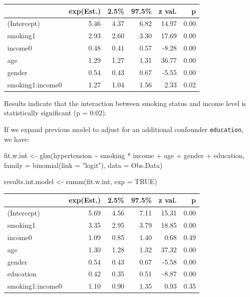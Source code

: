 \documentclass[
  letterpaper,
  DIV=11,
  numbers=noendperiod]{scrreprt}
\newenvironment{Shaded}{\begin{snugshade}}{\end{snugshade}}
\newcommand{\AttributeTok}[1]{\textcolor[rgb]{0.40,0.45,0.13}{#1}}
\newcommand{\ConstantTok}[1]{\textcolor[rgb]{0.56,0.35,0.01}{#1}}
\newcommand{\FunctionTok}[1]{\textcolor[rgb]{0.28,0.35,0.67}{#1}}
\newcommand{\NormalTok}[1]{\textcolor[rgb]{0.00,0.23,0.31}{#1}}
\newcommand{\OtherTok}[1]{\textcolor[rgb]{0.00,0.23,0.31}{#1}}
\newcommand{\SpecialCharTok}[1]{\textcolor[rgb]{0.37,0.37,0.37}{#1}}
\newcommand{\StringTok}[1]{\textcolor[rgb]{0.13,0.47,0.30}{#1}}
\begin{document}
\begin{table}[!h]
\centering
\begin{tabular}{lrrrrr}
\toprule
  & exp(Est.) & 2.5\% & 97.5\% & z val. & p\\
\midrule
(Intercept) & 5.46 & 4.37 & 6.82 & 14.97 & 0.00\\
smoking1 & 2.93 & 2.60 & 3.30 & 17.69 & 0.00\\
income0 & 0.48 & 0.41 & 0.57 & -8.28 & 0.00\\
age & 1.29 & 1.27 & 1.31 & 36.77 & 0.00\\
gender & 0.54 & 0.43 & 0.67 & -5.55 & 0.00\\
\addlinespace
smoking1:income0 & 1.27 & 1.04 & 1.56 & 2.33 & 0.02\\
\bottomrule
\end{tabular}
\end{table}

Results indicate that the interaction between smoking status and income
level is statistically significant (p = 0.02).

If we expand previous model to adjust for an additional confounder
\texttt{education}, we have:

\begin{Shaded}
\begin{Highlighting}[]
\NormalTok{fit.w.int }\OtherTok{\textless{}{-}} \FunctionTok{glm}\NormalTok{(hypertension }\SpecialCharTok{\textasciitilde{}}\NormalTok{ smoking }\SpecialCharTok{*}\NormalTok{ income }\SpecialCharTok{+}\NormalTok{ age }\SpecialCharTok{+}\NormalTok{ gender }\SpecialCharTok{+}\NormalTok{ education, }
                 \AttributeTok{family =} \FunctionTok{binomial}\NormalTok{(}\AttributeTok{link =} \StringTok{"logit"}\NormalTok{), }
                 \AttributeTok{data =}\NormalTok{ Obs.Data)}

\NormalTok{results.int.model }\OtherTok{\textless{}{-}} \FunctionTok{summ}\NormalTok{(fit.w.int, }\AttributeTok{exp =} \ConstantTok{TRUE}\NormalTok{)}
\end{Highlighting}
\end{Shaded}

\begin{table}[!h]
\centering
\begin{tabular}{lrrrrr}
\toprule
  & exp(Est.) & 2.5\% & 97.5\% & z val. & p\\
\midrule
(Intercept) & 5.69 & 4.56 & 7.11 & 15.31 & 0.00\\
smoking1 & 3.35 & 2.95 & 3.79 & 18.85 & 0.00\\
income0 & 1.09 & 0.85 & 1.40 & 0.68 & 0.49\\
age & 1.30 & 1.28 & 1.32 & 37.32 & 0.00\\
gender & 0.54 & 0.43 & 0.67 & -5.58 & 0.00\\
\addlinespace
education & 0.42 & 0.35 & 0.51 & -8.87 & 0.00\\
smoking1:income0 & 1.10 & 0.90 & 1.35 & 0.93 & 0.35\\
\bottomrule
\end{tabular}
\end{table}
\end{document}
